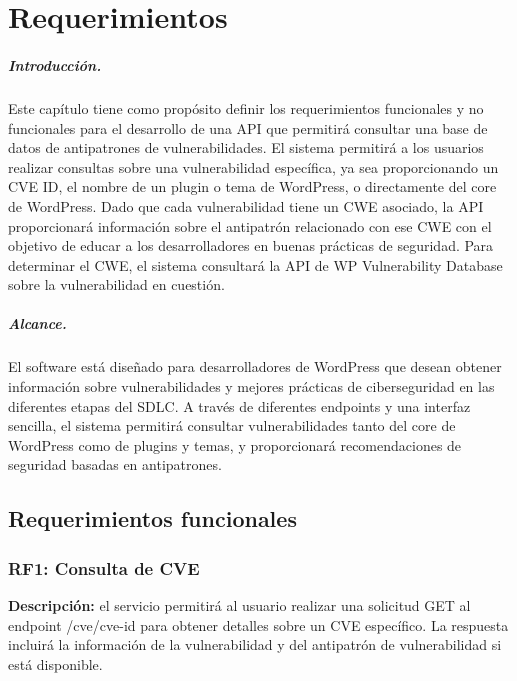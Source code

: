 \chapter{Requerimientos}

\paragraph{Introducción.}
Este capítulo tiene como propósito definir los requerimientos funcionales y no funcionales para el desarrollo de una API que permitirá consultar una base de datos de antipatrones de vulnerabilidades. El sistema permitirá a los usuarios realizar consultas sobre una vulnerabilidad específica, ya sea proporcionando un CVE ID, el nombre de un plugin o tema de WordPress, o directamente del core de WordPress. Dado que cada vulnerabilidad tiene un CWE asociado, la API proporcionará información sobre el antipatrón relacionado con ese CWE con el objetivo de educar a los desarrolladores en buenas prácticas de seguridad. Para determinar el CWE, el sistema consultará la API de WP Vulnerability Database sobre la vulnerabilidad en cuestión.

\paragraph{Alcance.}

El software está diseñado para desarrolladores de WordPress que desean obtener información sobre vulnerabilidades y mejores prácticas de ciberseguridad en las diferentes etapas del SDLC. A través de diferentes endpoints y una interfaz sencilla, el sistema permitirá consultar vulnerabilidades tanto del core de WordPress como de plugins y temas, y proporcionará recomendaciones de seguridad basadas en antipatrones.


\section{Requerimientos funcionales}

\subsection{RF1: Consulta de CVE}

\textbf{Descripción:} el servicio permitirá al usuario realizar una solicitud GET al endpoint /cve/{cve-id} para obtener detalles sobre un CVE específico. La respuesta incluirá la información de la vulnerabilidad y del antipatrón de vulnerabilidad si está disponible.

